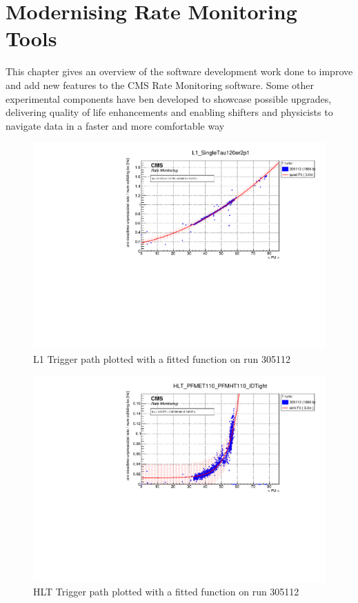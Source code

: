 \chapter{Modernising Rate Monitoring Tools}

This chapter gives an overview of the software development work done to improve and add new features to the CMS Rate Monitoring software. Some other experimental components have ben developed to showcase possible upgrades, delivering quality of life enhancements and enabling shifters and physicists to navigate data in a faster and more comfortable way \cite{VivaceRTM1}

\begin{figure}
	\centerline{
		\includegraphics[width=0.6\paperwidth]{figures/RMT_305112_L1_SingleTau120er2p1.pdf}}
	\caption{L1 Trigger path plotted with a fitted function on run 305112}
	\label{fig:ratemon_l1}
\end{figure}

\begin{figure}
	\centerline{
		\includegraphics[width=0.6\paperwidth]{figures/RMT_305112_HLT_PFMET110_PFMHT110_IDTight.pdf}}
	\caption{HLT Trigger path plotted with a fitted function on run 305112}
	\label{fig:ratemon_hlt}
\end{figure}


